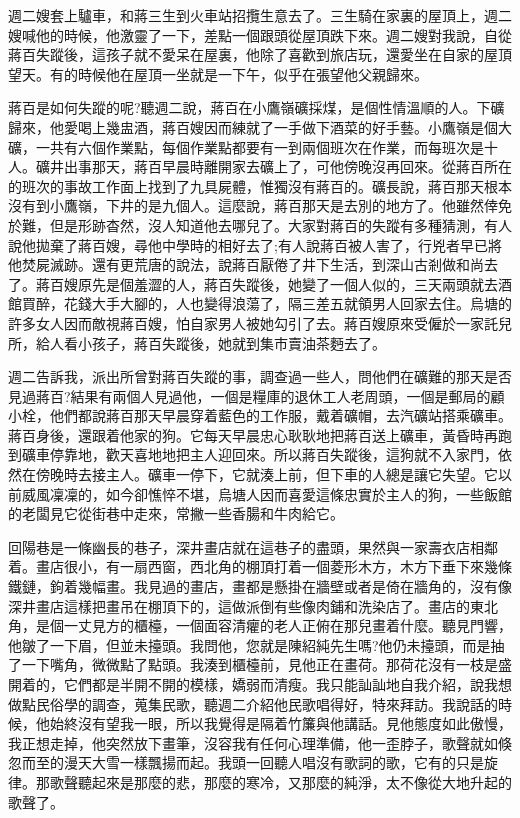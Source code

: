 \documentclass[a6paper]{article}
\begin{document}
週二嫂套上驢車，和蔣三生到火車站招攬生意去了。三生騎在家裏的屋頂上，週二嫂喊他的時候，他激靈了一下，差點一個跟頭從屋頂跌下來。週二嫂對我說，自從蔣百失蹤後，這孩子就不愛呆在屋裏，他除了喜歡到旅店玩，還愛坐在自家的屋頂望天。有的時候他在屋頂一坐就是一下午，似乎在張望他父親歸來。

蔣百是如何失蹤的呢?聽週二說，蔣百在小鷹嶺礦採煤，是個性情溫順的人。下礦歸來，他愛喝上幾盅酒，蔣百嫂因而練就了一手做下酒菜的好手藝。小鷹嶺是個大礦，一共有六個作業點，每個作業點都要有一到兩個班次在作業，而每班次是十人。礦井出事那天，蔣百早晨時離開家去礦上了，可他傍晚沒再回來。從蔣百所在的班次的事故工作面上找到了九具屍體，惟獨沒有蔣百的。礦長說，蔣百那天根本沒有到小鷹嶺，下井的是九個人。這麼說，蔣百那天是去別的地方了。他雖然倖免於難，但是形跡杳然，沒人知道他去哪兒了。大家對蔣百的失蹤有多種猜測，有人說他拋棄了蔣百嫂，尋他中學時的相好去了;有人說蔣百被人害了，行兇者早已將他焚屍滅跡。還有更荒唐的說法，說蔣百厭倦了井下生活，到深山古剎做和尚去了。蔣百嫂原先是個羞澀的人，蔣百失蹤後，她變了一個人似的，三天兩頭就去酒館買醉，花錢大手大腳的，人也變得浪蕩了，隔三差五就領男人回家去住。烏塘的許多女人因而敵視蔣百嫂，怕自家男人被她勾引了去。蔣百嫂原來受僱於一家託兒所，給人看小孩子，蔣百失蹤後，她就到集市賣油茶麪去了。

週二告訴我，派出所曾對蔣百失蹤的事，調查過一些人，問他們在礦難的那天是否見過蔣百?結果有兩個人見過他，一個是糧庫的退休工人老周頭，一個是郵局的顧小栓，他們都說蔣百那天早晨穿着藍色的工作服，戴着礦帽，去汽礦站搭乘礦車。蔣百身後，還跟着他家的狗。它每天早晨忠心耿耿地把蔣百送上礦車，黃昏時再跑到礦車停靠地，歡天喜地地把主人迎回來。所以蔣百失蹤後，這狗就不入家門，依然在傍晚時去接主人。礦車一停下，它就湊上前，但下車的人總是讓它失望。它以前威風凜凜的，如今卻憔悴不堪，烏塘人因而喜愛這條忠實於主人的狗，一些飯館的老闆見它從街巷中走來，常撇一些香腸和牛肉給它。

回陽巷是一條幽長的巷子，深井畫店就在這巷子的盡頭，果然與一家壽衣店相鄰着。畫店很小，有一扇西窗，西北角的棚頂打着一個菱形木方，木方下垂下來幾條鐵鏈，鉤着幾幅畫。我見過的畫店，畫都是懸掛在牆壁或者是倚在牆角的，沒有像深井畫店這樣把畫吊在棚頂下的，這做派倒有些像肉鋪和洗染店了。畫店的東北角，是個一丈見方的櫃檯，一個面容清癯的老人正俯在那兒畫着什麼。聽見門響，他皺了一下眉，但並未擡頭。我問他，您就是陳紹純先生嗎?他仍未擡頭，而是抽了一下嘴角，微微點了點頭。我湊到櫃檯前，見他正在畫荷。那荷花沒有一枝是盛開着的，它們都是半開不開的模樣，嬌弱而清瘦。我只能訕訕地自我介紹，說我想做點民俗學的調查，蒐集民歌，聽週二介紹他民歌唱得好，特來拜訪。我說話的時候，他始終沒有望我一眼，所以我覺得是隔着竹簾與他講話。見他態度如此傲慢，我正想走掉，他突然放下畫筆，沒容我有任何心理準備，他一歪脖子，歌聲就如倏忽而至的漫天大雪一樣飄揚而起。我頭一回聽人唱沒有歌詞的歌，它有的只是旋律。那歌聲聽起來是那麼的悲，那麼的寒冷，又那麼的純淨，太不像從大地升起的歌聲了。
\end{document}
